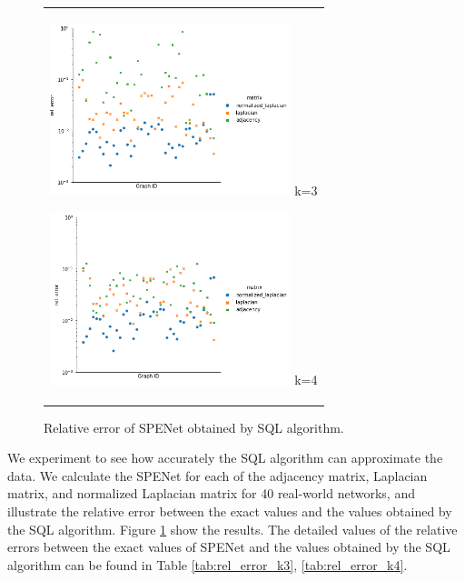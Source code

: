 \documentclass[senior,final,11pt]{iscs-thesis}
\begin{document}
\begin{figure}[htbp]
    \begin{center}
      \begin{tabular}{c}
        \begin{minipage}{0.5\hsize}
          \begin{center}
            \includegraphics[clip, width=7cm]{./figure/plot_each_graph_k3.png}
            \hspace{1.6cm} k=3
          \end{center}
        \end{minipage}
        \begin{minipage}{0.5\hsize}
          \begin{center}
            \includegraphics[clip, width=7cm]{./figure/plot_each_graph_k4.png}
            \hspace{1.6cm} k=4
          \end{center}
        \end{minipage}
      \end{tabular}
      \caption{Relative error of SPENet obtained by SQL algorithm.}
      \label{fig:error_each_graph}
    \end{center}
  \end{figure}

We experiment to see how accurately the SQL algorithm can approximate the data. We calculate the SPENet for each of the adjacency matrix, Laplacian matrix, and normalized Laplacian matrix for 40 real-world networks, and illustrate the relative error between the exact values and the values obtained by the SQL algorithm. Figure \ref{fig:error_each_graph} show the results. The detailed values of the relative errors between the exact values of SPENet and the values obtained by the SQL algorithm can be found in Table \ref{tab:rel_error_k3}, \ref{tab:rel_error_k4}.
\end{document}
